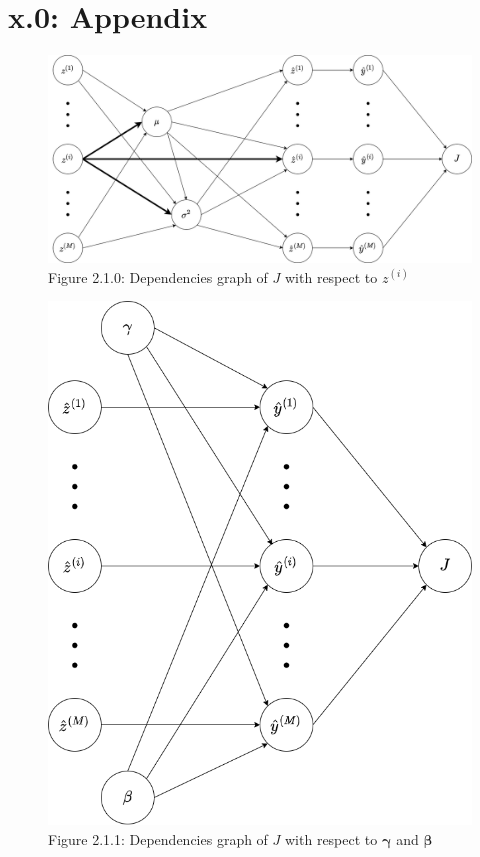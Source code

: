 \documentclass{article}
\begin{document}
\section*{x.0: Appendix}
\begin{figure}[!ht]
    \captionsetup{labelformat=empty}
    \includegraphics[scale=0.4]{Batch Norm dependencies graph.drawio.png}
    \caption{Figure 2.1.0: Dependencies graph of $J$ with respect to $z^{(i)}$}
\end{figure}
\begin{figure}[!ht]
    \captionsetup{labelformat=empty}
    \includegraphics[scale=0.4]{Dependencies graph with beta gamma.drawio.png}
    \caption{Figure 2.1.1: Dependencies graph of $J$ with respect to $\boldsymbol{\gamma}$ and $\boldsymbol{\beta}$}  
\end{figure}
\end{document}
